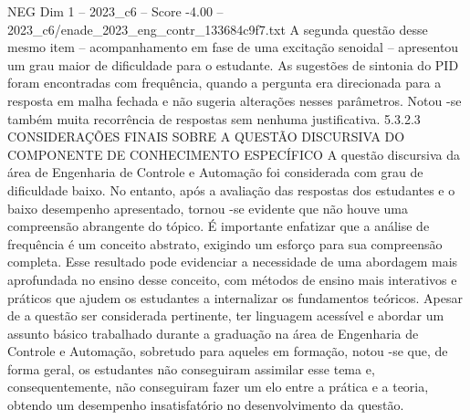 \begin{textsample}{NEG Dim 1 – 2023\_c6 – Score -4.00 – 2023\_c6/enade\_2023\_eng\_contr\_133684c9f7.txt}
A segunda questão desse mesmo item – acompanhamento em fase de uma excitação senoidal – apresentou um grau maior de dificuldade para o estudante.
As sugestões de sintonia do PID foram encontradas com frequência, quando a pergunta era direcionada para a resposta em malha fechada e não sugeria alterações nesses parâmetros.
Notou -se também muita recorrência de respostas sem nenhuma justificativa. 5.3.2.3 CONSIDERAÇÕES FINAIS SOBRE A QUESTÃO DISCURSIVA DO COMPONENTE DE CONHECIMENTO ESPECÍFICO A questão discursiva da área de Engenharia de Controle e Automação foi considerada com grau de dificuldade baixo.
No entanto, após a avaliação das respostas dos estudantes e o baixo desempenho apresentado, tornou -se evidente que não houve uma compreensão abrangente do tópico.
É importante enfatizar que a análise de frequência é um conceito abstrato, exigindo um esforço para sua compreensão completa.
Esse resultado pode evidenciar a necessidade de uma abordagem mais aprofundada no ensino desse conceito, com métodos de ensino mais interativos e práticos que ajudem os estudantes a internalizar os fundamentos teóricos.
Apesar de a questão ser considerada pertinente, ter linguagem acessível e abordar um assunto básico trabalhado durante a graduação na área de Engenharia de Controle e Automação, sobretudo para aqueles em formação, notou -se que, de forma geral, os estudantes não conseguiram assimilar esse tema e, consequentemente, não conseguiram fazer um elo entre a prática e a teoria, obtendo um desempenho insatisfatório no desenvolvimento da questão.

\end{textsample}
